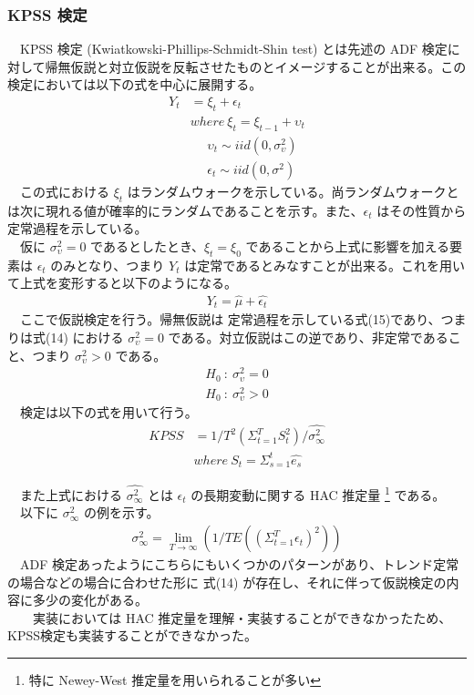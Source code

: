\documentclass{scrartcl}
\begin{document}
\subsubsection{KPSS 検定}
\label{sec:orgc451067}
　KPSS 検定 (Kwiatkowski-Phillips-Schmidt-Shin test) とは先述の ADF 検定に対して帰無仮説と対立仮説を反転させたものとイメージすることが出来る。この検定においては以下の式を中心に展開する。\\
\begin{align}
Y_t &= \xi_t + \epsilon_t \nonumber \\
 &where \ \xi_t = \xi_{t-1} + \upsilon_t \nonumber \\
 &\ \ \ \ \ \ \upsilon_t \sim iid(0, \sigma_{\upsilon}^2) \nonumber \\
 &\ \ \ \ \ \ \epsilon_t \sim iid(0, \sigma^2)
\end{align}
　この式における \(\xi_t\) はランダムウォークを示している。尚ランダムウォークとは次に現れる値が確率的にランダムであることを示す。また、\(\epsilon_t\) はその性質から定常過程を示している。\\
　仮に \(\sigma_{\upsilon}^2 = 0\) であるとしたとき、\(\xi_t = \xi_0\) であることから上式に影響を加える要素は \(\epsilon_t\) のみとなり、つまり \(Y_t\) は定常であるとみなすことが出来る。これを用いて上式を変形すると以下のようになる。\\
\begin{align}
Y_t = \hat{\mu} + \hat{\epsilon_t}
\end{align}
　ここで仮説検定を行う。帰無仮説は 定常過程を示している式(15)であり、つまりは式(14) における \(\sigma_{\upsilon}^2 = 0\) である。対立仮説はこの逆であり、非定常であること、つまり \(\sigma_{\upsilon}^2 > 0\) である。\\
\begin{align}
H_0 \ :\ \sigma_{\upsilon}^2 = 0 \\
H_0 \ :\ \sigma_{\upsilon}^2 > 0
\end{align}
　検定は以下の式を用いて行う。\\
\begin{align}
KPSS &= 1/T^2 (\Sigma^{T}_{t = 1}S_t^2)/ \hat{\sigma^2_\infty} \nonumber \\ 
&where\  S_t = \Sigma_{s=1}^t \hat{e_s} 
\end{align}

　また上式における \(\hat{\sigma^2_\infty}\) とは \(\epsilon_t\) の長期変動に関する HAC 推定量 \footnote{特に Newey-West 推定量を用いられることが多い} である。\\
　以下に \(\sigma^2_\infty\) の例を示す。\cite{STAN:STAN272}
\begin{align}
\sigma^2_\infty = \lim_{T \rightarrow \infty} (1/T E((\Sigma_{t=1}^T \epsilon_t)^2))
\end{align}
　ADF 検定あったようにこちらにもいくつかのパターンがあり、トレンド定常の場合などの場合に合わせた形に 式(14) が存在し、それに伴って仮説検定の内容に多少の変化がある。\\
　　実装においては HAC 推定量を理解・実装することができなかったため、KPSS検定も実装することができなかった。\\
\end{document}
